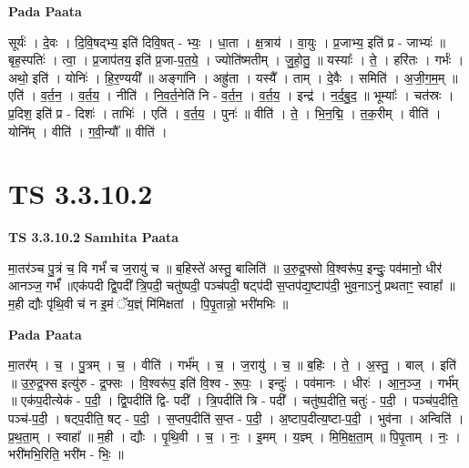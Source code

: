\documentclass[17pt]{extarticle}
\begin{document}
\textbf{Pada Paata} \newline

सूर्यः॑ । दे॒वः । दि॒वि॒षद्भ्य॒ इति॑ दिवि॒षत् - भ्यः॒ । धा॒ता । क्ष॒त्राय॑ । वा॒युः । प्र॒जाभ्य॒ इति॑ प्र - जाभ्यः॑ ॥ बृह॒स्पतिः॑ । त्वा॒ । प्र॒जाप॑तय॒ इति॑ प्र॒जा-प॒त॒ये॒ । ज्योति॑ष्मतीम् । जु॒हो॒तु॒ ॥ यस्याः᳚ । ते॒ । हरि॑तः । गर्भः॑ । अथो॒ इति॑ । योनिः॑ । हि॒र॒ण्ययी᳚ ॥ अङ्गा॑नि । अह्रु॑ता । यस्यै᳚ । ताम् । दे॒वैः । समिति॑ । अ॒जी॒ग॒म॒म् ॥ एति॑ । व॒र्त॒न॒ । व॒र्त॒य॒ । नीति॑ । नि॒व॒र्त॒नेति॑ नि - व॒र्त॒न॒ । व॒र्त॒य॒ । इन्द्र॑ । न॒र्द॒बु॒द॒ ॥ भूम्याः᳚ । चत॑स्रः । प्र॒दिश॒ इति॑ प्र - दिशः॑ । ताभिः॑ । एति॑ । व॒र्त॒य॒ । पुनः॑ ॥ वीति॑ । ते॒ । भि॒न॒द्मि॒ । त॒क॒रीम् । वीति॑ । योनि᳚म् । वीति॑ । ग॒वी॒न्यौ᳚ ॥ वीति॑ ।  \newline




\section*{ TS 3.3.10.2 }

\textbf{TS 3.3.10.2 } \newline
\textbf{Samhita Paata} \newline

मा॒तर॑ञ्च पु॒त्रं च॒ वि गर्भं॑ च ज॒रायु॑ च ॥ ब॒हिस्ते॑ अस्तु॒ बालिति॑ ॥ उ॒रु॒द्र॒फ्सो वि॒श्वरू॑प॒ इन्दुः॒ पव॑मानो॒ धीर॑ आनञ्ज॒ गर्भं᳚ ॥एक॑पदी द्वि॒पदी᳚ त्रि॒पदी॒ चतु॑ष्पदी॒ पञ्च॑पदी॒ षट्प॑दी स॒प्तप॑द्य॒ष्टाप॑दी॒ भुव॒नाऽनु॑ प्रथताꣳ॒॒ स्वाहा᳚ ॥ म॒ही द्यौः पृ॑थि॒वी च॑ न इ॒मं ॅय॒ज्ञ्ं मि॑मिक्षतां । पि॒पृ॒तान्नो॒ भरी॑मभिः ॥ \newline

\textbf{Pada Paata} \newline

मा॒तर᳚म् । च॒ । पु॒त्रम् । च॒ । वीति॑ । गर्भ᳚म् । च॒ । ज॒रायु॑ । च॒ ॥ ब॒हिः । ते॒ । अ॒स्तु॒ । बाल् । इति॑ ॥ उ॒रु॒द्र॒फ्स इत्यु॑रु - द्र॒फ्सः । वि॒श्वरू॑प॒ इति॑ वि॒श्व - रू॒पः॒ । इन्दुः॑ । पव॑मानः । धीरः॑ । आ॒न॒ञ्ज॒ । गर्भ᳚म् ॥ एक॑प॒दीत्येक॑ - प॒दी॒ । द्वि॒पदीति॑ द्वि- पदी᳚ । त्रि॒पदीति॑ त्रि - पदी᳚ । चतु॑ष्प॒दीति॒ चतुः॑ - प॒दी॒ । पञ्च॑प॒दीति॒ पञ्च॑-प॒दी॒ । षट्प॒दीति॒ षट् - प॒दी॒ । स॒प्तप॒दीति॑ स॒प्त - प॒दी॒ । अ॒ष्टाप॒दीत्य॒ष्टा-प॒दी॒ । भुव॑ना । अन्विति॑ । प्र॒थ॒ता॒म् । स्वाहा᳚ ॥ म॒ही । द्यौः । पृ॒थि॒वी । च॒ । नः॒ । इ॒मम् । य॒ज्ञ्म् । मि॒मि॒क्ष॒ता॒म् ॥ पि॒पृ॒ताम् । नः॒ । भरी॑मभि॒रिति॒ भरी॑म - भिः॒ ॥  \newline
\end{document}

